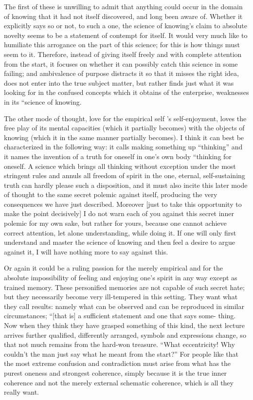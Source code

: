 The first of these is unwilling to admit
that anything could occur in the domain of knowing
that it had not itself discovered,
and long been aware of.
Whether it explicitly says so or not, to such a one,
the science of knowing’s claim to absolute novelty
seems to be a statement of contempt for itself.
It would very much like to humiliate
this arrogance on the part of this science;
for this is how things must seem to it.
Therefore, instead of giving itself freely
and with complete attention from the start,
it focuses on whether it can possibly catch
this science in some failing;
and ambivalence of purpose distracts it
so that it misses the right idea,
does not enter into the true subject matter,
but rather finds just what it was looking for
in the confused concepts
which it obtains of the enterprise,
weaknesses in its “science of knowing.

The other mode of thought,
love for the empirical self ’s self-enjoyment,
loves the free play of its mental capacities
(which it partially becomes)
with the objects of knowing
(which it in the same manner partially becomes).
I think it can best be characterized in the following way:
it calls making something up “thinking”
and it names the invention of a truth
for oneself in one’s own body
“thinking for oneself.
A science which brings all
thinking without exception
under the most stringent rules
and annuls all freedom of spirit
in the one, eternal, self-sustaining truth
can hardly please such a disposition,
and it must also incite this later
mode of thought to the same
secret polemic against itself,
producing the very consequences we have just described.
Moreover [just to take this opportunity
to make the point decisively]
I do not warn each of you against
this secret inner polemic for my own sake,
but rather for yours,
because one cannot achieve correct attention,
let alone understanding,
while doing it.
If one will only first understand
and master the science of knowing
and then feel a desire to argue against it,
I will have nothing more to say against this.

Or again it could be a ruling passion for the merely empirical and for
the absolute impossibility of feeling and enjoying one’s spirit in any way except
as trained memory.
These personified memories are not capable of such secret
hate; but they necessarily become very ill-tempered in this setting.
They want
what they call results: namely what can be observed and can be reproduced in
similar circumstances; “[that is] a sufficient statement and one that says some-
thing.
Now when they think they have grasped something of this kind, the
next lecture arrives further qualified, differently arranged, symbols
and expressions change, so that not much remains from the hard-won treasure.
“What eccentricity! Why couldn’t the man just say what he meant from
the start?”
For people like that the most extreme confusion and contradiction
must arise from what has the purest oneness and strongest coherence,
simply because it is the true inner coherence
and not the merely external schematic coherence,
which is all they really want.

